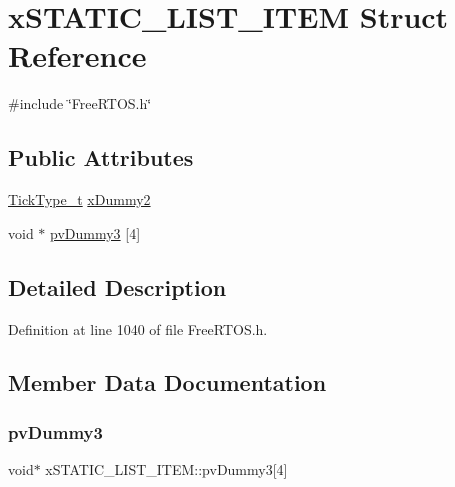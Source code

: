 \hypertarget{structxSTATIC__LIST__ITEM}{}\section{x\+S\+T\+A\+T\+I\+C\+\_\+\+L\+I\+S\+T\+\_\+\+I\+T\+EM Struct Reference}
\label{structxSTATIC__LIST__ITEM}


{\ttfamily \#include \char`\"{}Free\+R\+T\+O\+S.\+h\char`\"{}}

\subsection*{Public Attributes}
\begin{DoxyCompactItemize}
\item 
\hyperlink{pic32mx_2portmacro_8h_aa69c48c6e902ce54f70886e6573c92a9}{Tick\+Type\+\_\+t} \hyperlink{structxSTATIC__LIST__ITEM_a902f5a362987a85e76338f233e16817e}{x\+Dummy2}
\item 
void $\ast$ \hyperlink{structxSTATIC__LIST__ITEM_ac8df611d8ab21275ef688b0ca7ca352c}{pv\+Dummy3} \mbox{[}4\mbox{]}
\end{DoxyCompactItemize}


\subsection{Detailed Description}


Definition at line 1040 of file Free\+R\+T\+O\+S.\+h.



\subsection{Member Data Documentation}
\mbox{\label{structxSTATIC__LIST__ITEM_ac8df611d8ab21275ef688b0ca7ca352c}} 
\subsubsection{\texorpdfstring{pv\+Dummy3}{pvDummy3}}
{\footnotesize\ttfamily void$\ast$ x\+S\+T\+A\+T\+I\+C\+\_\+\+L\+I\+S\+T\+\_\+\+I\+T\+E\+M\+::pv\+Dummy3\mbox{[}4\mbox{]}}



